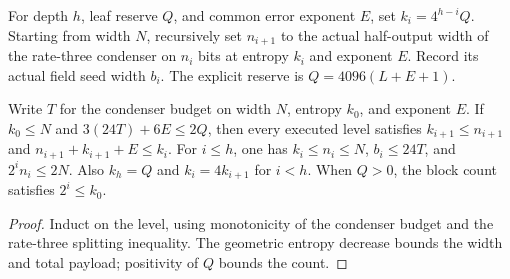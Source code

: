 \begin{definition}
  \label{def:lowerbounds-algebraic-recursive-parameters}
  \leanok
  For depth $h$, leaf reserve $Q$, and common error exponent $E$, set
  $k_i=4^{h-i}Q$. Starting from width $N$, recursively set $n_{i+1}$ to
  the actual half-output width of the rate-three condenser on $n_i$ bits
  at entropy $k_i$ and exponent $E$. Record its actual field seed width
  $b_i$. The explicit reserve is $Q=4096(L+E+1)$.
\end{definition}

\begin{theorem}
  \label{thm:lowerbounds-algebraic-recursive-parameters}
  \leanok
  Write $T$ for the condenser budget on width $N$, entropy $k_0$, and
  exponent $E$. If $k_0\le N$ and $3(24T)+6E\le2Q$, then every executed
  level satisfies $k_{i+1}\le n_{i+1}$ and
  $n_{i+1}+k_{i+1}+E\le k_i$. For $i\le h$, one has
  $k_i\le n_i\le N$, $b_i\le24T$, and $2^in_i\le2N$.
  Also $k_h=Q$ and $k_i=4k_{i+1}$ for $i<h$.
  When $Q>0$, the block count satisfies $2^i\le k_0$.
\end{theorem}
\begin{proof}
  \leanok
  Induct on the level, using monotonicity of the condenser budget and
  the rate-three splitting inequality. The geometric entropy decrease
  bounds the width and total payload; positivity of $Q$ bounds the count.
\end{proof}

